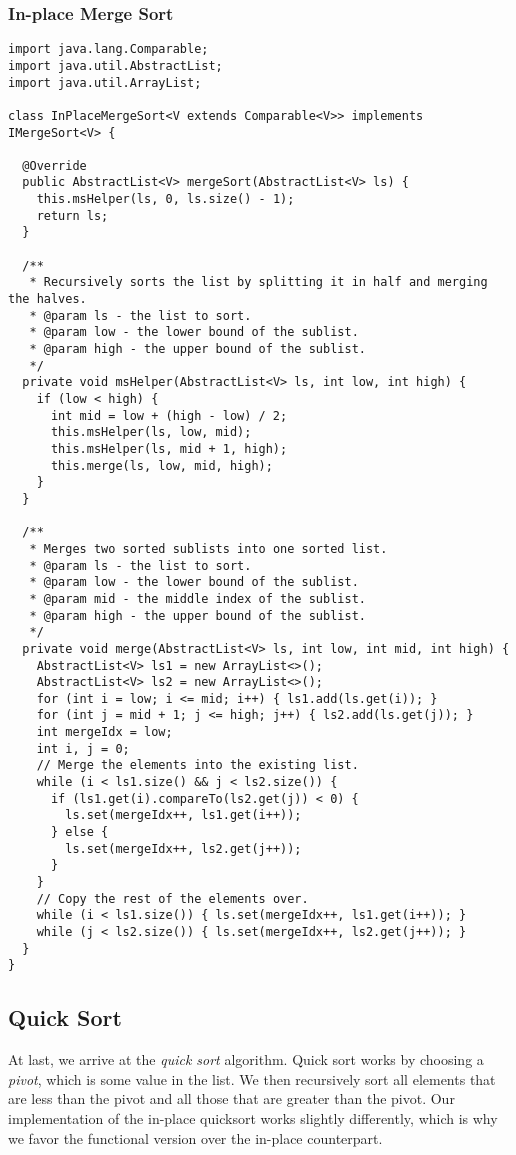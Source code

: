 \subsubsection*{In-place Merge Sort}
\begin{lstlisting}[language=MyJava]
import java.lang.Comparable;
import java.util.AbstractList;
import java.util.ArrayList;

class InPlaceMergeSort<V extends Comparable<V>> implements IMergeSort<V> {

  @Override
  public AbstractList<V> mergeSort(AbstractList<V> ls) {
    this.msHelper(ls, 0, ls.size() - 1);
    return ls;
  }

  /**
   * Recursively sorts the list by splitting it in half and merging the halves.
   * @param ls - the list to sort.
   * @param low - the lower bound of the sublist. 
   * @param high - the upper bound of the sublist.
   */
  private void msHelper(AbstractList<V> ls, int low, int high) {
    if (low < high) {
      int mid = low + (high - low) / 2;
      this.msHelper(ls, low, mid);
      this.msHelper(ls, mid + 1, high);
      this.merge(ls, low, mid, high);
    }
  }

  /**
   * Merges two sorted sublists into one sorted list. 
   * @param ls - the list to sort.
   * @param low - the lower bound of the sublist.
   * @param mid - the middle index of the sublist.
   * @param high - the upper bound of the sublist.
   */
  private void merge(AbstractList<V> ls, int low, int mid, int high) {
    AbstractList<V> ls1 = new ArrayList<>();
    AbstractList<V> ls2 = new ArrayList<>();
    for (int i = low; i <= mid; i++) { ls1.add(ls.get(i)); }
    for (int j = mid + 1; j <= high; j++) { ls2.add(ls.get(j)); }
    int mergeIdx = low;
    int i, j = 0;
    // Merge the elements into the existing list.
    while (i < ls1.size() && j < ls2.size()) {
      if (ls1.get(i).compareTo(ls2.get(j)) < 0) { 
        ls.set(mergeIdx++, ls1.get(i++)); 
      } else { 
        ls.set(mergeIdx++, ls2.get(j++)); 
      }
    }
    // Copy the rest of the elements over.
    while (i < ls1.size()) { ls.set(mergeIdx++, ls1.get(i++)); }
    while (j < ls2.size()) { ls.set(mergeIdx++, ls2.get(j++)); }
  }
}
\end{lstlisting}

\newpage
\subsection{Quick Sort}
At last, we arrive at the \emph{quick sort} algorithm. 
Quick sort works by choosing a \emph{pivot}, which is some value in the list. 
We then recursively sort all elements that are less than the pivot and all those that are greater than the pivot. 
Our implementation of the in-place quicksort works slightly differently, which is why we favor the functional version over the in-place counterpart. 

